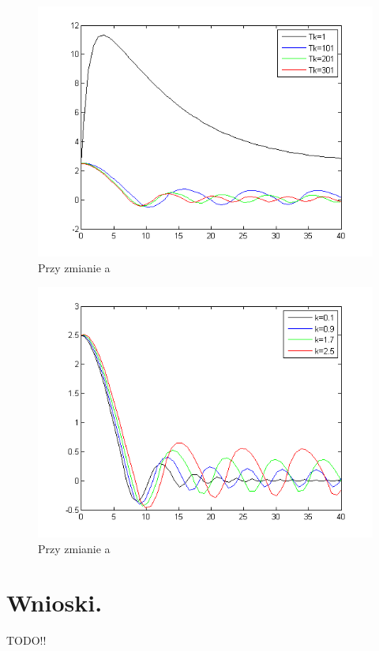 \documentclass[a4paper,10pt]{article}
\begin{document}
\begin{enumerate}
\begin{figure}[!h]
    \centering
	\includegraphics[width=120mm]{CW3-korekcja-trojpolozeniowyBH-e_Tk.png}
	\caption{Przy zmianie a}
    \label{fig:Rysunek}
\end{figure}

\begin{figure}[!h]
    \centering
	\includegraphics[width=120mm]{CW3-korekcja-trojpolozeniowyBH-e_k.png}
	\caption{Przy zmianie a}
    \label{fig:Rysunek}
\end{figure}

\end{enumerate}

\section{Wnioski.}\label{sec:wnioski}
TODO!!
\end{document}
